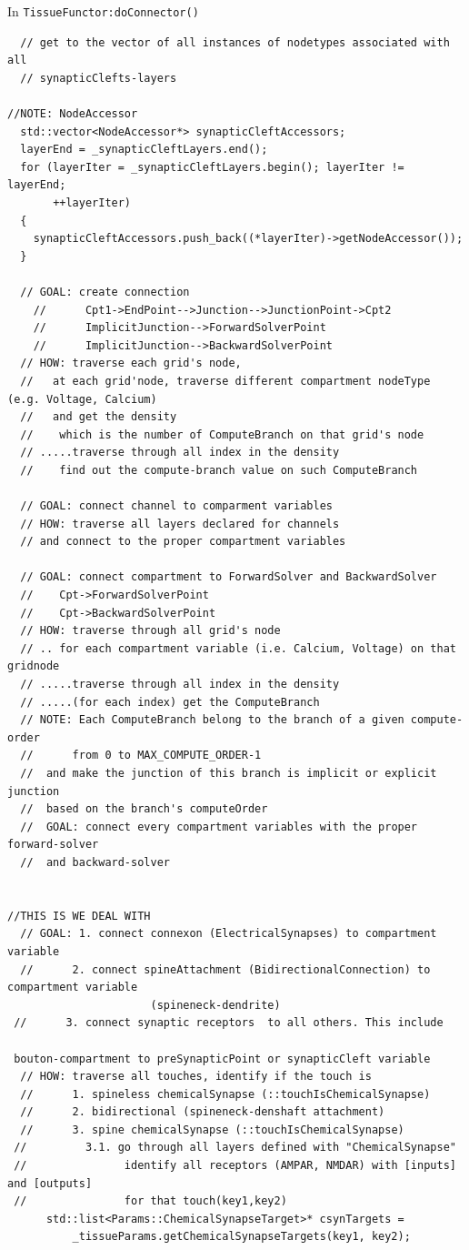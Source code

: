 In \verb!TissueFunctor:doConnector()!
\begin{verbatim}
  // get to the vector of all instances of nodetypes associated with all
  // synapticClefts-layers

//NOTE: NodeAccessor
  std::vector<NodeAccessor*> synapticCleftAccessors;
  layerEnd = _synapticCleftLayers.end();
  for (layerIter = _synapticCleftLayers.begin(); layerIter != layerEnd;
       ++layerIter)
  {
    synapticCleftAccessors.push_back((*layerIter)->getNodeAccessor());
  }

  // GOAL: create connection 
    //      Cpt1->EndPoint-->Junction-->JunctionPoint->Cpt2
    //      ImplicitJunction-->ForwardSolverPoint
    //      ImplicitJunction-->BackwardSolverPoint
  // HOW: traverse each grid's node, 
  //   at each grid'node, traverse different compartment nodeType (e.g. Voltage, Calcium)
  //   and get the density
  //    which is the number of ComputeBranch on that grid's node
  // .....traverse through all index in the density
  //    find out the compute-branch value on such ComputeBranch
  
  // GOAL: connect channel to comparment variables
  // HOW: traverse all layers declared for channels
  // and connect to the proper compartment variables

  // GOAL: connect compartment to ForwardSolver and BackwardSolver
  //    Cpt->ForwardSolverPoint
  //    Cpt->BackwardSolverPoint
  // HOW: traverse through all grid's node
  // .. for each compartment variable (i.e. Calcium, Voltage) on that gridnode
  // .....traverse through all index in the density
  // .....(for each index) get the ComputeBranch
  // NOTE: Each ComputeBranch belong to the branch of a given compute-order
  //      from 0 to MAX_COMPUTE_ORDER-1
  //  and make the junction of this branch is implicit or explicit junction
  //  based on the branch's computeOrder
  //  GOAL: connect every compartment variables with the proper forward-solver
  //  and backward-solver


//THIS IS WE DEAL WITH
  // GOAL: 1. connect connexon (ElectricalSynapses) to compartment variable
  //      2. connect spineAttachment (BidirectionalConnection) to compartment variable
                      (spineneck-dendrite) 
 //      3. connect synaptic receptors  to all others. This include
 
 bouton-compartment to preSynapticPoint or synapticCleft variable
  // HOW: traverse all touches, identify if the touch is 
  //      1. spineless chemicalSynapse (::touchIsChemicalSynapse)
  //      2. bidirectional (spineneck-denshaft attachment)
  //      3. spine chemicalSynapse (::touchIsChemicalSynapse)
 //         3.1. go through all layers defined with "ChemicalSynapse"
 //               identify all receptors (AMPAR, NMDAR) with [inputs] and [outputs]
 //               for that touch(key1,key2)
      std::list<Params::ChemicalSynapseTarget>* csynTargets =
          _tissueParams.getChemicalSynapseTargets(key1, key2);
          

\end{verbatim}
